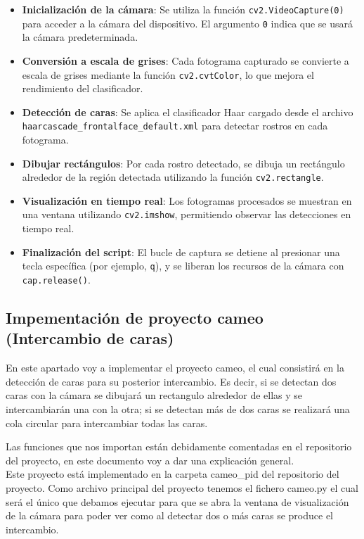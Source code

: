 \documentclass[a4paper]{article}
\begin{document}
\begin{itemize}
    \item \textbf{Inicialización de la cámara}: Se utiliza la función \texttt{cv2.VideoCapture(0)} para acceder a la cámara del dispositivo. El argumento \texttt{0} indica que se usará la cámara predeterminada.
    \item \textbf{Conversión a escala de grises}: Cada fotograma capturado se convierte a escala de grises mediante la función \texttt{cv2.cvtColor}, lo que mejora el rendimiento del clasificador.
    \item \textbf{Detección de caras}: Se aplica el clasificador Haar cargado desde el archivo \texttt{haarcascade\_frontalface\_default.xml} para detectar rostros en cada fotograma.
    \item \textbf{Dibujar rectángulos}: Por cada rostro detectado, se dibuja un rectángulo alrededor de la región detectada utilizando la función \texttt{cv2.rectangle}.
    \item \textbf{Visualización en tiempo real}: Los fotogramas procesados se muestran en una ventana utilizando \texttt{cv2.imshow}, permitiendo observar las detecciones en tiempo real.
    \item \textbf{Finalización del script}: El bucle de captura se detiene al presionar una tecla específica (por ejemplo, \texttt{q}), y se liberan los recursos de la cámara con \texttt{cap.release()}.
\end{itemize}


\subsection{Impementación de proyecto cameo (Intercambio de caras)}

En este apartado voy a implementar el proyecto cameo, el cual consistirá en la detección de caras para su posterior intercambio.
Es decir, si se detectan dos caras con la cámara se dibujará un rectangulo alrededor de ellas y se intercambiarán una con la otra; si se detectan más de dos caras se realizará una cola circular para intercambiar todas las caras.

Las funciones que nos importan están debidamente comentadas en el repositorio del proyecto, en este documento voy a dar una explicación general.\\

Este proyecto está implementado en la carpeta cameo\_pid del repositorio del proyecto.
Como archivo principal del proyecto tenemos el fichero cameo.py el cual será el único que debamos ejecutar para que se abra la ventana de visualización de la cámara para poder ver como al detectar dos o más caras se produce el intercambio.
\end{document}
